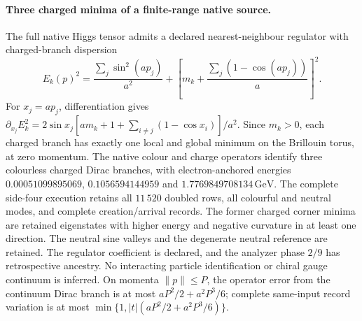 \paragraph{Three charged minima of a finite-range native source.}
The full native Higgs tensor admits a declared nearest-neighbour regulator
with charged-branch dispersion
\[
 E_k(p)^2=\frac{\sum_j\sin^2(ap_j)}{a^2}
 +\left[m_k+\frac{\sum_j(1-\cos(ap_j))}{a}\right]^2.
\]
For $x_j=ap_j$, differentiation gives
$\partial_{x_j}E_k^2=2\sin x_j
[am_k+1+\sum_{i\ne j}(1-\cos x_i)]/a^2$.
Since $m_k>0$, each charged branch has exactly one local and global
minimum on the Brillouin torus, at zero momentum.
The native colour and charge operators identify three colourless charged
Dirac branches, with electron-anchored energies
$0.00051099895069$, $0.1056594144959$ and $1.7769849708134\,\mathrm{GeV}$.
The complete side-four execution retains all $11\,520$ doubled rows,
all colourful and neutral modes, and complete creation/arrival records.
The former charged corner minima are retained eigenstates with higher
energy and negative curvature in at least one direction.
The neutral sine valleys and the degenerate neutral reference are retained.
The regulator coefficient is declared, and the analyzer phase $2/9$
has retrospective ancestry. No interacting particle identification or
chiral gauge continuum is inferred. On momenta $\lVert p\rVert\leq P$,
the operator error from the continuum Dirac branch is at most
$aP^2/2+a^2P^3/6$; complete same-input record variation is at most
$\min\{1,|t|(aP^2/2+a^2P^3/6)\}$.
